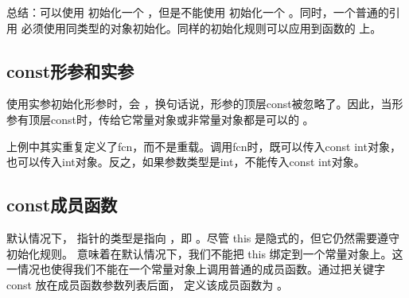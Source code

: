 \documentclass[letterpaper,10pt,english]{sphinxmanual}
\begin{document}
总结：可以使用  初始化一个  ，但是不能使用  初始化一个  。同时，一个普通的引用
必须使用同类型的对象初始化。同样的初始化规则可以应用到函数的  上。


\subsection{const形参和实参}
\label{\detokenize{cpp/22_const:id1}}
使用实参初始化形参时，会  ，换句话说，形参的顶层const被忽略了。因此，当形参有顶层const时，传给它常量对象或非常量对象都是可以的 。

%
\begin{sphinxVerbatim}[commandchars=\\\{\}]
    
    
\end{sphinxVerbatim}

上例中其实重复定义了fcn，而不是重载。调用fcn时，既可以传入const int对象，也可以传入int对象。反之，如果参数类型是int，不能传入const int对象。


\subsection{const成员函数}
\label{\detokenize{cpp/22_const:id2}}
默认情况下， 指针的类型是指向  ，即  。尽管 this 是隐式的，但它仍然需要遵守初始化规则。
意味着在默认情况下，我们不能把 this 绑定到一个常量对象上。这一情况也使得我们不能在一个常量对象上调用普通的成员函数。通过把关键字 const 放在成员函数参数列表后面，
定义该成员函数为  。

%
\begin{sphinxVerbatim}[commandchars=\\\{\}]
 
    
\end{sphinxVerbatim}
\end{document}
